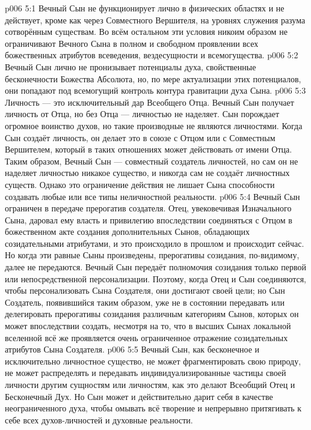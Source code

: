 \vs p006 5:1 Вечный Сын не функционирует лично в физических областях и не действует, кроме как через Совместного Вершителя, на уровнях служения разума сотворённым существам. Во всём остальном эти условия никоим образом не ограничивают Вечного Сына в полном и свободном проявлении всех божественных атрибутов  всеведения, вездесущности и всемогущества.
\vs p006 5:2 Вечный Сын лично не пронизывает потенциалы духа, свойственные бесконечности Божества Абсолюта, но, по мере актуализации этих потенциалов, они попадают под всемогущий контроль контура гравитации духа Сына.
\vs p006 5:3 Личность --- это исключительный дар Всеобщего Отца. Вечный Сын получает личность от Отца, но без Отца --- личностью не наделяет. Сын порождает огромное воинство духов, но такие производные не являются личностями. Когда Сын создаёт личность, он делает это в союзе с Отцом или с Совместным Вершителем, который в таких отношениях может действовать от имени Отца. Таким образом, Вечный Сын --- совместный создатель личностей, но сам он не наделяет личностью никакое существо, и никогда сам не создаёт личностных существ. Однако это ограничение действия не лишает Сына способности создавать любые или все типы неличностной реальности.
\vs p006 5:4 Вечный Сын ограничен в передаче прерогатив создателя. Отец, увековечивая Изначального Сына, даровал ему власть и привилегию впоследствии соединяться с Отцом в божественном акте создания дополнительных Сынов, обладающих созидательными атрибутами, и это происходило в прошлом и происходит сейчас. Но когда эти равные Сыны произведены, прерогативы созидания, по\hyp{}видимому, далее не передаются. Вечный Сын передаёт полномочия созидания только первой или непосредственной персонализации. Поэтому, когда Отец и Сын соединяются, чтобы персонализовать Сына Создателя, они достигают своей цели; но Сын Создатель, появившийся таким образом, уже не в состоянии передавать или делегировать прерогативы созидания различным категориям Сынов, которых он может впоследствии создать, несмотря на то, что в высших Сынах локальной вселенной всё же проявляется очень ограниченное отражение созидательных атрибутов Сына Создателя.
\vs p006 5:5 Вечный Сын, как бесконечное и исключительно личностное существо, не может фрагментировать свою природу, не может распределять и передавать индивидуализированные частицы своей личности другим сущностям или личностям, как это делают Всеобщий Отец и Бесконечный Дух. Но Сын может и действительно дарит себя в качестве неограниченного духа, чтобы омывать всё творение и непрерывно притягивать к себе всех духов\hyp{}личностей и духовные реальности.
